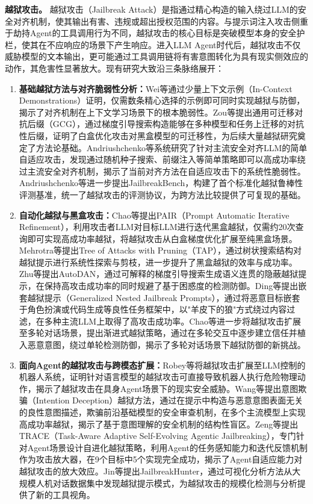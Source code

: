 \textbf{越狱攻击。}
越狱攻击（Jailbreak Attack）是指通过精心构造的输入绕过LLM的安全对齐机制，使其输出有害、违规或超出授权范围的内容。与提示词注入攻击侧重于劫持Agent的工具调用行为不同，越狱攻击的核心目标是突破模型本身的安全护栏，使其在不应响应的场景下产生响应。进入LLM Agent时代后，越狱攻击不仅威胁模型的文本输出，更可能通过工具调用链将有害意图转化为具有现实侧效应的动作，其危害性显著放大。现有研究大致沿三条脉络展开：
\begin{enumerate}
  \item \textbf{基础越狱方法与对齐脆弱性分析：}Wei等\cite{wei2023jailbreak}通过少量上下文示例（In-Context Demonstrations）证明，仅需数条精心选择的示例即可同时实现越狱与防御，揭示了对齐机制在上下文学习场景下的根本脆弱性。Zou等\cite{zou2023universal}提出通用可迁移对抗后缀（GCG），通过梯度引导搜索构造能够在多种模型和任务上迁移的对抗性后缀，证明了白盒优化攻击对黑盒模型的可迁移性，为后续大量越狱研究奠定了方法论基础。Andriushchenko等\cite{andriushchenko2025jailbreaking}系统研究了针对主流安全对齐LLM的简单自适应攻击，发现通过随机种子搜索、前缀注入等简单策略即可以高成功率绕过主流安全对齐机制，揭示了当前对齐方法在自适应攻击下的系统性脆弱性。Andriushchenko等\cite{andriushchenko2024jailbreakbench}进一步提出JailbreakBench，构建了首个标准化越狱鲁棒性评测基准，统一了越狱攻击的评测协议，为跨方法比较提供了可复现的基础。
  \item \textbf{自动化越狱与黑盒攻击：}Chao等\cite{chao2025jailbreaking}提出PAIR（Prompt Automatic Iterative Refinement），利用攻击者LLM对目标LLM进行迭代黑盒越狱，仅需约20次查询即可实现高成功率越狱，将越狱攻击从白盒梯度优化扩展至纯黑盒场景。Mehrotra等\cite{mehrotra2024tree}提出Tree of Attacks with Pruning（TAP），通过树状搜索结构对越狱提示进行系统性探索与剪枝，进一步提升了黑盒越狱的效率与成功率。Zhu等\cite{zhu2023autodan}提出AutoDAN，通过可解释的梯度引导搜索生成语义连贯的隐蔽越狱提示，在保持高攻击成功率的同时规避了基于困惑度的检测防御。Ding等\cite{ding2024wolf}提出嵌套越狱提示（Generalized Nested Jailbreak Prompts），通过将恶意目标嵌套于角色扮演或代码生成等良性任务框架中，以"羊皮下的狼"方式绕过内容过滤，在多种主流LLM上取得了高攻击成功率。Chao等\cite{chao2025jailbreaking}进一步将越狱攻击扩展至多轮对话场景，提出渐进式越狱策略，通过在多轮交互中逐步建立信任并植入恶意意图，绕过单轮检测防御，揭示了多轮对话场景下越狱防御的新挑战。
  \item \textbf{面向Agent的越狱攻击与跨模态扩展：}Robey等\cite{robey2025jailbreaking}将越狱攻击扩展至LLM控制的机器人系统，证明针对语言模型的越狱攻击可直接导致机器人执行危险物理动作，揭示了越狱攻击在具身Agent场景下的现实安全威胁。Wang等\cite{wang2026jailbreaking}提出意图欺骗（Intention Deception）越狱方法，通过在提示中构造与恶意意图表面无关的良性意图描述，欺骗前沿基础模型的安全审查机制，在多个主流模型上实现高成功率越狱，揭示了基于意图理解的安全机制的结构性盲区。Zeng等\cite{zeng2026trace}提出TRACE（Task-Aware Adaptive Self-Evolving Agentic Jailbreaking），专门针对Agent场景设计自进化越狱策略，利用Agent的任务感知能力和迭代反馈机制作为攻击放大器，在9个目标中5个实现完全成功，揭示了Agent自适应能力对越狱攻击的放大效应。Jin等\cite{jin2025jailbreakhunter}提出JailbreakHunter，通过可视化分析方法从大规模人机对话数据集中发现越狱提示模式，为越狱攻击的规模化检测与分析提供了新的工具视角。
\end{enumerate}

